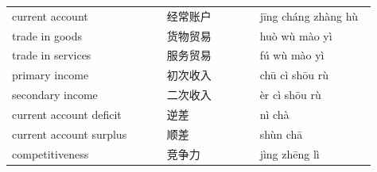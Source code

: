 \documentclass[11pt]{article}
\begin{document}
\begin{longtable}{@{}p{0.40\linewidth}p{0.24\linewidth}p{0.30\linewidth}@{}}
current account & 经常账户 & jīng cháng zhàng hù \\
trade in goods & 货物贸易 & huò wù mào yì \\
trade in services & 服务贸易 & fú wù mào yì \\
primary income & 初次收入 & chū cì shōu rù \\
secondary income & 二次收入 & èr cì shōu rù \\
current account deficit & 逆差 & nì chà \\
current account surplus & 顺差 & shùn chā \\
competitiveness & 竞争力 & jìng zhēng lì \\
\end{longtable}
\end{document}
